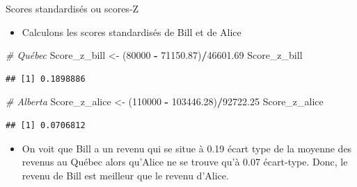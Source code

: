 \documentclass[ignorenonframetext,]{beamer}
\newenvironment{Shaded}{\begin{snugshade}}{\end{snugshade}}
\newcommand{\DecValTok}[1]{\textcolor[rgb]{0.00,0.00,0.81}{#1}}
\newcommand{\FloatTok}[1]{\textcolor[rgb]{0.00,0.00,0.81}{#1}}
\newcommand{\StringTok}[1]{\textcolor[rgb]{0.31,0.60,0.02}{#1}}
\newcommand{\CommentTok}[1]{\textcolor[rgb]{0.56,0.35,0.01}{\textit{#1}}}
\newcommand{\OperatorTok}[1]{\textcolor[rgb]{0.81,0.36,0.00}{\textbf{#1}}}
\newcommand{\NormalTok}[1]{#1}
\providecommand{\tightlist}{%
  \setlength{\itemsep}{0pt}\setlength{\parskip}{0pt}}
\begin{document}
\begin{frame}[fragile]{Scores standardisés ou scores-Z}

\begin{itemize}
\tightlist
\item
  Calculons les scores standardisés de Bill et de Alice
\end{itemize}

\begin{Shaded}
\begin{Highlighting}[]
\CommentTok{# Québec}
\NormalTok{Score_z_bill <-}\StringTok{ }\NormalTok{(}\DecValTok{80000} \OperatorTok{-}\StringTok{ }\FloatTok{71150.87}\NormalTok{)}\OperatorTok{/}\FloatTok{46601.69}
\NormalTok{Score_z_bill}
\end{Highlighting}
\end{Shaded}

\begin{verbatim}
## [1] 0.1898886
\end{verbatim}

\begin{Shaded}
\begin{Highlighting}[]
\CommentTok{# Alberta}
\NormalTok{Score_z_alice <-}\StringTok{ }\NormalTok{(}\DecValTok{110000} \OperatorTok{-}\StringTok{ }\FloatTok{103446.28}\NormalTok{)}\OperatorTok{/}\FloatTok{92722.25}
\NormalTok{Score_z_alice}
\end{Highlighting}
\end{Shaded}

\begin{verbatim}
## [1] 0.0706812
\end{verbatim}

\begin{itemize}
\tightlist
\item
  On voit que Bill a un revenu qui se situe à 0.19 écart type de la
  moyenne des revenus au Québec alors qu'Alice ne se trouve qu'à 0.07
  écart-type. Donc, le revenu de Bill est meilleur que le revenu
  d'Alice.
\end{itemize}

\end{frame}
\end{document}
